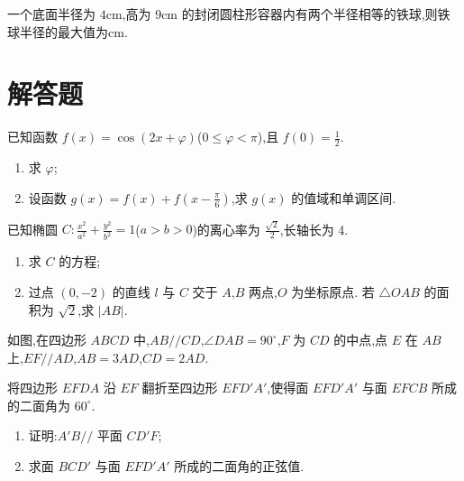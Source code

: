 \begin{problem}
一个底面半径为 \(4\text{cm}\),高为 \(9\text{cm}\) 的封闭圆柱形容器内有两个半径相等的铁球,则铁球半径的最大值为\fillinblank{}\(\text{cm}\).
\end{problem}

\section{解答题}

\begin{problem}
已知函数 \(f(x)=\cos(2x+\varphi)\)(\(0\le \varphi<\pi\)),且 \(f(0)=\frac12\).
\begin{enumerate}
\item 求 \(\varphi\);
\item 设函数 \(g(x)=f(x)+f\left(x-\frac{\pi}{6}\right)\),求 \(g(x)\) 的值域和单调区间.
\end{enumerate}
\end{problem}

\begin{problem}
已知椭圆 \(C:\frac{x^2}{a^2}+\frac{y^2}{b^2}=1\)(\(a>b>0\))的离心率为 \(\frac{\sqrt2}{2}\),长轴长为 4.
\begin{enumerate}
\item 求 \(C\) 的方程;
\item 过点 \((0,-2)\) 的直线 \(l\) 与 \(C\) 交于 \(A\),\(B\) 两点,\(O\) 为坐标原点. 若 \(\triangle OAB\) 的面积为 \(\sqrt2\),求 \(|AB|\).
\end{enumerate}
\end{problem}

\begin{problem}
如图,在四边形 \(ABCD\) 中,\(AB//CD\),\(\angle DAB=90^\circ\),\(F\) 为 \(CD\) 的中点,点 \(E\) 在 \(AB\) 上,\(EF//AD\),\(AB=3AD\),\(CD=2AD\).

将四边形 \(EFDA\) 沿 \(EF\) 翻折至四边形 \(EFD'A'\),使得面 \(EFD'A'\) 与面 \(EFCB\) 所成的二面角为 \(60^\circ\).
\begin{enumerate}
\item 证明:\(A'B//\) 平面 \(CD'F\);
\item 求面 \(BCD'\) 与面 \(EFD'A'\) 所成的二面角的正弦值.
\end{enumerate}

\end{problem}

